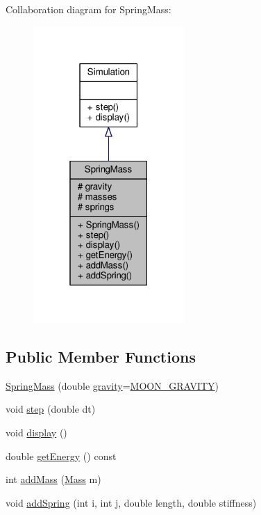 Collaboration diagram for Spring\+Mass\+:
\nopagebreak
\begin{figure}[H]
\begin{center}
\leavevmode
\includegraphics[width=163pt]{classSpringMass__coll__graph}
\end{center}
\end{figure}
\subsection*{Public Member Functions}
\begin{DoxyCompactItemize}
\item 
\hyperlink{classSpringMass_a5c94ec5d3adf73a7b3b7e9dd10045132}{Spring\+Mass} (double \hyperlink{classSpringMass_a8153c487713e1eea29caf109bc49e373}{gravity}=\hyperlink{springmass_8h_a03ad3bae72a0ac7965460a63fd454f44}{M\+O\+O\+N\+\_\+\+G\+R\+A\+V\+I\+TY})
\item 
void \hyperlink{classSpringMass_a187503b09da458570891a38612864e75}{step} (double dt)
\item 
void \hyperlink{classSpringMass_a97dc8e01e829e466198b3a8c201a5b13}{display} ()
\item 
double \hyperlink{classSpringMass_a1700091076aa83fff57fdec6876bf138}{get\+Energy} () const
\item 
int \hyperlink{classSpringMass_ac5185db5ea4078e3af82b7031d893302}{add\+Mass} (\hyperlink{classMass}{Mass} m)
\item 
void \hyperlink{classSpringMass_a61799a4987d64402de52f3772b68e8b2}{add\+Spring} (int i, int j, double length, double stiffness)
\end{DoxyCompactItemize}
